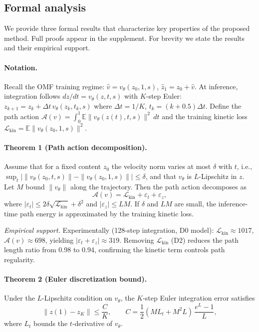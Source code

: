 ﻿\documentclass[letterpaper]{article}
\begin{document}
\subsection{Formal analysis}
\label{sec:formal}
We provide three formal results that characterize key properties
of the proposed method.  Full proofs appear in the supplement.
For brevity we state the results and their empirical support.

\paragraph{Notation.}
Recall the OMF training regime: $\hat v = v_\theta(z_0,1,s)$,
$\hat z_1 = z_0 + \hat v$.
At inference, integration follows $dz/dt=v_\theta(z,t,s)$ with
$K$-step Euler: $z_{k+1}=z_k+\Delta t\,v_\theta(z_k,t_k,s)$
where $\Delta t=1/K$, $t_k=(k+0.5)\Delta t$.
Define the path action
$\mathcal{A}(v)=\int_0^1\mathbb{E}\|v_\theta(z(t),t,s)\|^2\,dt$
and the training kinetic loss
$\mathcal{L}_{\mathrm{kin}}=\mathbb{E}\|v_\theta(z_0,1,s)\|^2$.

\paragraph{Theorem 1 (Path action decomposition).}
Assume that for a fixed content $z_0$ the velocity norm varies
at most $\delta$ with $t$, i.e.,
$\sup_t\bigl|\|v_\theta(z_0,t,s)\|-\|v_\theta(z_0,1,s)\|\bigr|\leq\delta$,
and that $v_\theta$ is $L$-Lipschitz in $z$.
Let $M$ bound $\|v_\theta\|$ along the trajectory.
Then the path action decomposes as
\begin{equation}
\mathcal{A}(v) = \mathcal{L}_{\mathrm{kin}}
+ \varepsilon_t + \varepsilon_z,
\label{eq:action_decomp}
\end{equation}
where $|\varepsilon_t|\leq 2\delta\sqrt{\mathcal{L}_{\mathrm{kin}}}+\delta^2$
and $|\varepsilon_z|\leq L M$.
If $\delta$ and $L M$ are small, the inference-time path energy
is approximated by the training kinetic loss.

\emph{Empirical support.}
Experimentally (128-step integration, D0 model):
$\mathcal{L}_{\mathrm{kin}}\approx 1017$, $\mathcal{A}(v)\approx 698$,
yielding $|\varepsilon_t+\varepsilon_z|\approx 319$.
Removing $\mathcal{L}_{\mathrm{kin}}$ (D2) reduces the path length
ratio from 0.98 to 0.94, confirming the kinetic term controls
path regularity.

\paragraph{Theorem 2 (Euler discretization bound).}
Under the $L$-Lipschitz condition on $v_\theta$,
the $K$-step Euler integration error satisfies
\begin{equation}
\|z(1)-z_K\|\leq \frac{C}{K},\qquad
C=\frac{1}{2}(M L_t+M^2 L)\,\frac{e^L-1}{L},
\label{eq:euler_bound}
\end{equation}
where $L_t$ bounds the $t$-derivative of $v_\theta$.
\end{document}
